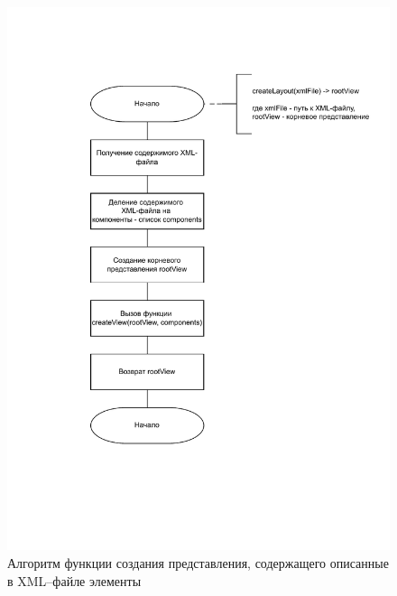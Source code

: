 \begin{figure}[!htb]
	\centering
	\includegraphics[scale=0.7]{img/createLayout.pdf}
	\caption{Алгоритм функции создания представления, содержащего описанные в XML--файле элементы}
	\label{fig:createLayout}
\end{figure}

